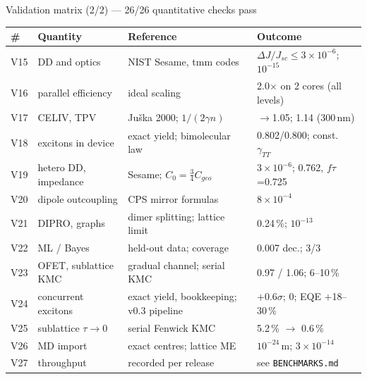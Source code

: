 \documentclass[aspectratio=169,10pt]{beamer}
\begin{document}
\begin{frame}{Validation matrix (2/2) --- 26/26 quantitative checks pass}
\tiny\setlength{\tabcolsep}{3pt}\renewcommand{\arraystretch}{0.95}
\begin{tabular}{@{}llll@{}}
\toprule
\# & Quantity & Reference & Outcome\\
\midrule
V15 & DD and optics & \alert{NIST Sesame}, \alert{tmm} codes & $\Delta J/J_{sc}\le3\times10^{-6}$; $10^{-15}$\\
V16 & parallel efficiency & ideal scaling & 2.0$\times$ on 2 cores (all levels)\\
V17 & CELIV, TPV & Juška 2000; $1/(2\gamma n)$ & $\to$1.05; 1.14 (300\,nm)\\
V18 & excitons in device & exact yield; bimolecular law & 0.802/0.800; const.\ $\gamma_{TT}$\\
V19 & hetero DD, impedance & Sesame; $C_0=\tfrac34C_{geo}$ & $3\times10^{-6}$; 0.762, $f\tau$=0.725\\
V20 & dipole outcoupling & CPS mirror formulas & $8\times10^{-4}$\\
V21 & DIPRO, graphs & dimer splitting; lattice limit & 0.24\,\%; $10^{-13}$\\
V22 & ML / Bayes & held-out data; coverage & 0.007 dec.; 3/3\\
V23 & OFET, sublattice KMC & gradual channel; serial KMC & 0.97 / 1.06; 6--10\,\%\\
V24 & concurrent excitons & exact yield, bookkeeping; v0.3 pipeline & $+0.6\sigma$; 0; EQE $+$18--30\,\%\\
V25 & sublattice $\tau\to0$ & serial Fenwick KMC & 5.2\,\% $\to$ 0.6\,\%\\
V26 & MD import & exact centres; lattice ME & $10^{-24}$\,m; $3\times10^{-14}$\\
V27 & throughput & recorded per release & see \texttt{BENCHMARKS.md}\\
\bottomrule
\end{tabular}
\end{frame}
\end{document}
